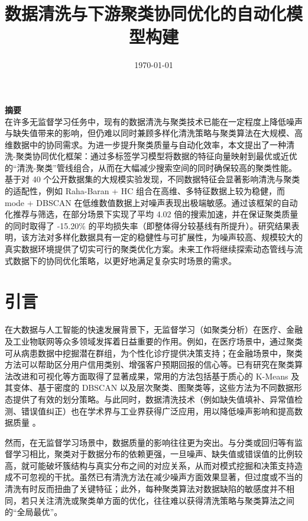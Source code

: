 \documentclass[10pt]{article} %
\numberwithin{equation}{section}
\begin{document}
\title{\textbf{数据清洗与下游聚类协同优化的自动化模型构建}}
\date{\today}
\maketitle

\noindent\textbf{\large 摘要} \\
在许多无监督学习任务中，现有的数据清洗与聚类技术已能在一定程度上降低噪声与缺失值带来的影响，但仍难以同时兼顾多样化清洗策略与聚类算法在大规模、高维数据中的协同需求。为进一步提升聚类质量与自动化效率，本文提出了一种清洗-聚类协同优化框架：通过多标签学习模型将数据的特征向量映射到最优或近优的“清洗-聚类”管线组合，从而在大幅减少搜索空间的同时确保较高的聚类性能。基于对 40 个公开数据集的大规模实验发现，不同数据特征会显著影响清洗与聚类的适配性，例如 Raha-Baran + HC 组合在高维、多特征数据上较为稳健，而 mode + DBSCAN 在低维数值数据上对噪声表现出极端敏感。通过该框架的自动化推荐与筛选，在部分场景下实现了平均 4.02 倍的搜索加速，并在保证聚类质量的同时取得了 -15.20\% 的平均损失率（即整体得分较基线有所提升）。研究结果表明，该方法对多样化数据具有一定的稳健性与可扩展性，为噪声较高、规模较大的真实数据环境提供了切实可行的聚类优化方案。未来工作将继续探索动态管线与流式数据下的协同优化策略，以更好地满足复杂实时场景的需求。

\section{引言}
在大数据与人工智能的快速发展背景下，无监督学习（如聚类分析）在医疗、金融及工业物联网等众多领域发挥着日益重要的作用\cite{10.3389/fncom.2019.00031, 7442571, app112311202}。例如，在医疗场景中，通过聚类可从病患数据中挖掘潜在群组，为个性化诊疗提供决策支持\cite{Sadeghi2021}；在金融场景中，聚类方法可以帮助区分用户信用类别、增强客户预期回报的信心等\cite{Cai2016}。已有研究在聚类算法改进和可视化等方面取得了显著成果，常用的方法包括基于质心的 K-Means 及其变体\cite{Bandyapadhyay2024, Zhang2025}、基于密度的 DBSCAN\cite{Abdulhameed2024, Guo2024} 以及层次聚类\cite{Ran2023}、图聚类\cite{10.1145/3299876}等，这些方法为不同数据形态提供了有效的划分策略。与此同时，数据清洗技术（例如缺失值填补、异常值检测、错误值纠正）也在学术界与工业界获得广泛应用，用以降低噪声影响和提高数据质量\cite{10.1145/2723372.2749431, 10.1145/2463676.2465327, Rekatsinas2017} 。

然而，在无监督学习场景中，数据质量的影响往往更为突出。与分类或回归等有监督学习相比，聚类对于数据分布的依赖更强，一旦噪声、缺失值或错误值的比例较高，就可能破坏簇结构与真实分布之间的对应关系\cite{Atif2024, Sloutsky2012}，从而对模式挖掘和决策支持造成不可忽视的干扰。虽然已有清洗方法在减少噪声方面效果显著，但过度或不当的清洗有时反而扭曲了关键特征\cite{Ni2023}；此外，每种聚类算法对数据缺陷的敏感度并不相同\cite{SINGH2024102799}，若只关注清洗或聚类单方面的优化，往往难以获得清洗策略与聚类算法之间的“全局最优”。
\end{document}
